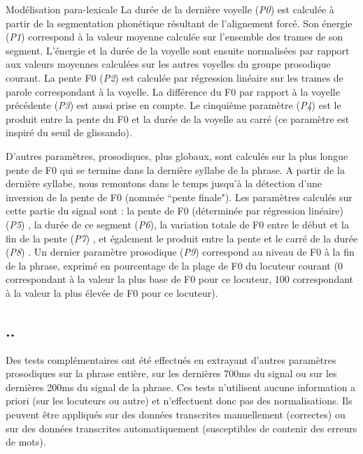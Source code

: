 \documentclass{style/these}
\newcommand{\hiddensubsection}[1]{
    \stepcounter{subsection}
    \subsection*{\arabic{chapter}.\arabic{section}.\arabic{subsection}\hspace{1em}{#1}}
}
\begin{document}
\begin{part}{Modélisation para-lexicale}
La durée de la dernière voyelle (\textit{P0}) est calculée à partir de la segmentation phonétique résultant de l'alignement forcé. 
Son énergie (\textit{P1}) correspond à la valeur moyenne calculée sur l'ensemble des trames de son segment. 
L'énergie et la durée de la voyelle sont ensuite normalisées par rapport aux valeurs moyennes calculées sur les autres voyelles du groupe prosodique courant. 
La pente F0 (\textit{P2}) est calculée par régression linéaire sur les trames de parole correspondant à la voyelle. 
La différence du F0 par rapport à la voyelle précédente (\textit{P3}) est aussi prise en compte. 
Le cinquième paramètre (\textit{P4}) est le produit entre la pente du F0 et la durée de la voyelle au carré (ce paramètre est inspiré du seuil de glissando).

D'autres paramètres, prosodiques, plus globaux, sont calculés sur la plus longue pente de F0 qui se termine dans la dernière syllabe de la phrase. 
A partir de la dernière syllabe, nous remontons dans le temps jusqu'à la détection d'une inversion de la pente de F0 (nommée ``pente finale"). 
Les paramètres calculés sur cette partie du signal sont : la pente de F0 (déterminée par régression linéaire) (\textit{P5}) , la durée de ce segment (\textit{P6}), la variation totale de F0 entre le début et la fin de la pente (\textit{P7}) , et également le produit entre la pente et le carré de la durée (\textit{P8}) . 
Un dernier paramètre prosodique (\textit{P9}) correspond au niveau de F0 à la fin de la phrase, exprimé en pourcentage de la plage de F0 du locuteur courant (0 correspondant à la valeur la plus base de F0 pour ce locuteur, 100 correspondant à la valeur la plus élevée de F0 pour ce locuteur).

\hiddensubsection{Paramètres sur segment arbitraire}

Des tests complémentaires ont été effectués en extrayant d'autres paramètres prosodiques sur la phrase entière, sur les dernières 700ms du signal ou sur les dernières 200ms du signal de la phrase. 
Ces tests n'utilisent aucune information a priori (sur les locuteurs ou autre) et n'effectuent donc pas des normalisations. 
Ils peuvent être appliqués sur des données transcrites manuellement (correctes) ou sur des données transcrites automatiquement (susceptibles de contenir des erreurs de mots). 



\end{part}
\end{document}
